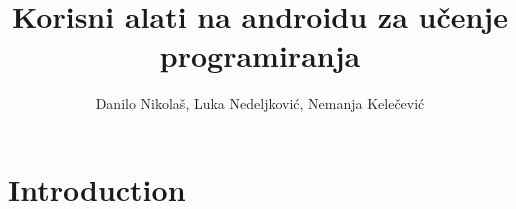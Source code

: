 \documentclass{article}
\title{Korisni alati na androidu za učenje programiranja}
\author{Danilo Nikolaš, Luka Nedeljković, Nemanja Kelečević }
\begin{document}
	
	\maketitle
	
	\section{Introduction}
	
\end{document}
